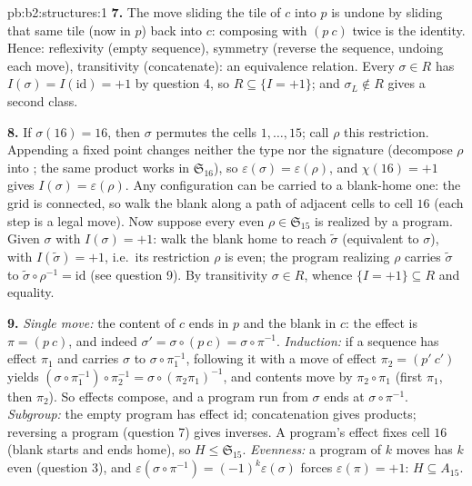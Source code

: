 \begin{solution}{pb:b2:structures:1}
\textbf{7.} The move sliding the tile of $c$ into $p$ is undone
by sliding that same tile (now in $p$) back into $c$: composing
with $(p\ c)$ twice is the identity. Hence: reflexivity (empty
sequence), symmetry (reverse the sequence, undoing each move),
transitivity (concatenate): an equivalence relation. Every
$\sigma \in R$ has $I(\sigma) = I(\mathrm{id}) = +1$ by question
4, so $R \subseteq \{I = +1\}$; and $\sigma_L \notin R$ gives a
second class.

\textbf{8.} If $\sigma(16) = 16$, then $\sigma$ permutes the
cells $1, \dots, 15$; call $\rho$ this restriction. Appending a
fixed point changes neither the  type nor the signature
(decompose $\rho$ into ; the same product works in
$\mathfrak{S}_{16}$), so $\varepsilon(\sigma) =
\varepsilon(\rho)$, and $\chi(16) = +1$ gives $I(\sigma) =
\varepsilon(\rho)$. Any configuration can be carried to a
blank-home one: the grid is connected, so walk the blank along a
path of adjacent cells to cell $16$ (each step is a legal move).
Now suppose every even $\rho \in \mathfrak{S}_{15}$ is realized
by a program. Given $\sigma$ with $I(\sigma) = +1$: walk the
blank home to reach $\widetilde\sigma$ (equivalent to $\sigma$),
with $I(\widetilde\sigma) = +1$, i.e.\ its restriction $\rho$ is
even; the program realizing $\rho$ carries $\widetilde\sigma$ to
$\widetilde\sigma \circ \rho^{-1} = \mathrm{id}$ (see question
9). By transitivity $\sigma \in R$, whence $\{I = +1\} \subseteq
R$ and equality.

\textbf{9.} \emph{Single move:} the content of $c$ ends in $p$
and the blank in $c$: the effect is $\pi = (p\ c)$, and indeed
$\sigma' = \sigma \circ (p\ c) = \sigma \circ \pi^{-1}$.
\emph{Induction:} if a sequence has effect $\pi_1$ and carries
$\sigma$ to $\sigma \circ \pi_1^{-1}$, following it with a move
of effect $\pi_2 = (p'\ c')$ yields $(\sigma \circ \pi_1^{-1})
\circ \pi_2^{-1} = \sigma \circ (\pi_2\pi_1)^{-1}$, and contents
move by $\pi_2 \circ \pi_1$ (first $\pi_1$, then $\pi_2$). So
effects compose, and a program run from $\sigma$ ends at $\sigma
\circ \pi^{-1}$. \emph{Subgroup:} the empty program has effect
$\mathrm{id}$; concatenation gives products; reversing a program
(question 7) gives inverses. A program's effect fixes cell $16$
(blank starts and ends home), so $H \leq \mathfrak{S}_{15}$.
\emph{Evenness:} a program of $k$ moves has $k$ even (question
3), and $\varepsilon(\sigma \circ \pi^{-1}) =
(-1)^k\varepsilon(\sigma)$ forces $\varepsilon(\pi) = +1$: $H
\subseteq A_{15}$.


\end{solution}
